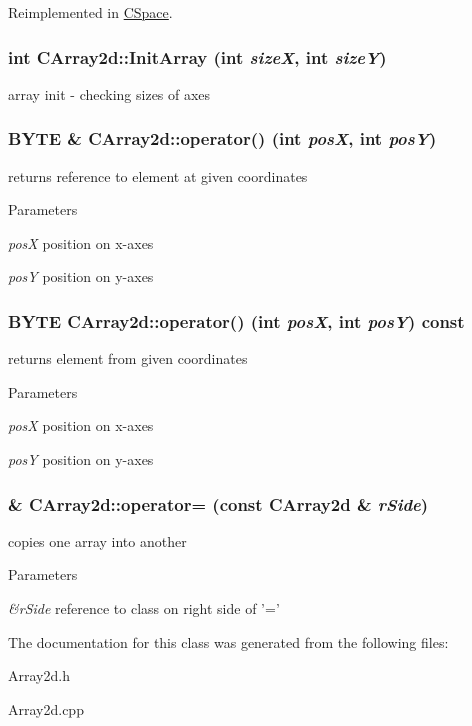 Reimplemented in \hyperlink{classCSpace_a0358e524cecae683cfbcf526ea99d818}{CSpace}.\hypertarget{classCArray2d_aa568ff144541b03023e1afc3c8fe9cba}{
\subsubsection[{InitArray}]{\setlength{\rightskip}{0pt plus 5cm}int CArray2d::InitArray (int {\em sizeX}, \/  int {\em sizeY})}}
\label{classCArray2d_aa568ff144541b03023e1afc3c8fe9cba}
array init -\/ checking sizes of axes \hypertarget{classCArray2d_aa2e06bfd438eff2979d51c87b561343b}{
\subsubsection[{operator()}]{\setlength{\rightskip}{0pt plus 5cm}BYTE \& CArray2d::operator() (int {\em posX}, \/  int {\em posY})}}
\label{classCArray2d_aa2e06bfd438eff2979d51c87b561343b}
returns reference to element at given coordinates


\begin{DoxyParams}{Parameters}
\item[{\em posX}]position on x-\/axes \item[{\em posY}]position on y-\/axes \end{DoxyParams}
\hypertarget{classCArray2d_a4d823e1efbdf408cf6960ccd9a40f651}{
\subsubsection[{operator()}]{\setlength{\rightskip}{0pt plus 5cm}BYTE CArray2d::operator() (int {\em posX}, \/  int {\em posY}) const}}
\label{classCArray2d_a4d823e1efbdf408cf6960ccd9a40f651}
returns element from given coordinates


\begin{DoxyParams}{Parameters}
\item[{\em posX}]position on x-\/axes \item[{\em posY}]position on y-\/axes \end{DoxyParams}
\hypertarget{classCArray2d_aed5c505b790e7b4ea06bf46ef67065f8}{
\subsubsection[{operator=}]{ \& CArray2d::operator= (const {\bf CArray2d} \& {\em rSide})}}
\label{classCArray2d_aed5c505b790e7b4ea06bf46ef67065f8}
copies one array into another


\begin{DoxyParams}{Parameters}
\item[{\em \&rSide}]reference to class on right side of '=' \end{DoxyParams}


The documentation for this class was generated from the following files:\begin{DoxyCompactItemize}
\item 
Array2d.h\item 
Array2d.cpp\end{DoxyCompactItemize}
